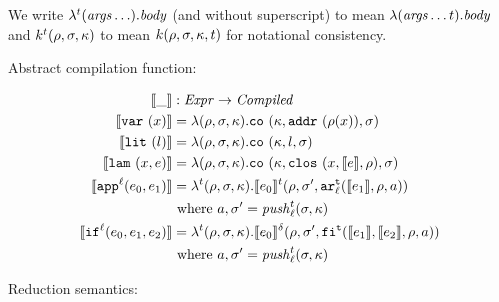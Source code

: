\documentclass{llncs}
\begin{document}
We write $\lambda^\mcntr(\mathit{args}\ldots). \mathit{body}$ (and without superscript) to mean
$\lambda(\mathit{args}\ldots \mcntr). \mathit{body}$ and
$\mcomp^\mcntr(\menv, \msto, \mkont)$ to mean $\mcomp(\menv, \msto,
\mkont, \mcntr)$ for notational consistency.

Abstract compilation function:

\begin{align*}
\compile{\_} &: \Expr \to \Compiled \\
\compile{\svar\mvar} &= \lambda(\menv,\msto,\mkont) .
                          \co{\mkont, \spchoice{\saddr{\menv(\mvar)}}{\superposition{\msto(\menv(\mvar))}},\msto}
\\
\compile{\slit\mlit} &= \lambda(\menv,\msto,\mkont) .
\co{\mkont,\mlit,\msto}
\\
\compile{\slam\mvar\mexp} &= \lambda(\menv,\msto,\mkont) .
\co{\mkont,\clos{\mvar,\compile\mexp,\menv},\msto}
\\
\compile{\sapp[^\mlab]{\mexpi0}{\mexpi1}} &= \lambda^\mcntr (\menv,\msto,\mkont) .
\compile{\mexpi0}^\mcntr(\menv,\msto',\kar[_\mlab^\mcntr]{\compile{\mexpi1},\menv,\maddr})
\\
&
\text{ where }\maddr,\msto' = \push^\mcntr_\mlab(\msto,\mkont)
\\
\compile{\sif[^\mlab]{\mexpi0}{\mexpi1}{\mexpi2}} &= \lambda^\mcntr(\menv,\msto,\mkont) .
\compile{\mexpi0}^\delta(\menv,\msto',\kif[^\mcntr]{\compile{\mexpi1},\compile{\mexpi2},\menv,\maddr})
\\
&\text{ where }\maddr,\msto' = \push_\mlab^\mcntr(\msto,\mkont)
\end{align*}

Reduction semantics:
\end{document}
